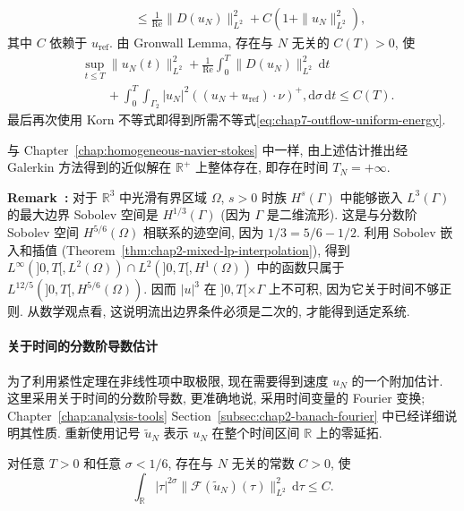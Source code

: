 \begin{sloppypar}
\begin{Proof}
\[\begin{aligned}
 &\qquad\leq\frac1{\operatorname{Re}}\|D(u_N)\|_{L^2}^2
 +C(1+\|u_N\|_{L^2}^2),
\end{aligned}
\]
其中 $C$ 依赖于 $u_{\mathrm{ref}}$. 由 Gronwall Lemma, 存在与 $N$ 无关的 $C(T)>0$, 使
\[
\begin{aligned}
 &\sup_{t\leq T}\|u_N(t)\|_{L^2}^2
 +\frac1{\operatorname{Re}}\int_0^T\|D(u_N)\|_{L^2}^2\,\mathrm dt\\
 &\qquad+\int_0^T\int_{\Gamma_2}|u_N|^2
 ((u_N+u_{\mathrm{ref}})\cdot\nu)^+,\mathrm d\sigma\,\mathrm dt
 \leq C(T).
\end{aligned}
\]
最后再次使用 Korn 不等式即得到所需不等式\eqref{eq:chap7-outflow-uniform-energy}.
\end{Proof}

与 Chapter~\ref{chap:homogeneous-navier-stokes} 中一样, 由上述估计推出经 Galerkin 方法得到的近似解在 $\mathbb R^+$ 上整体存在, 即存在时间 $T_N=+\infty$.

\par\noindent{}\textbf{Remark~\thechaptersevensectiononeremark:}\label{rem:chap7-quadratic-boundary-optimality}
对于 $\mathbb R^3$ 中光滑有界区域 $\Omega$, $s>0$ 时族 $H^s(\Gamma)$ 中能够嵌入 $L^3(\Gamma)$ 的最大边界 Sobolev 空间是 $H^{1/3}(\Gamma)$ (因为 $\Gamma$ 是二维流形). 这是与分数阶 Sobolev 空间 $H^{5/6}(\Omega)$ 相联系的迹空间, 因为 $1/3=5/6-1/2$. 利用 Sobolev 嵌入和插值 (Theorem~\ref{thm:chap2-mixed-lp-interpolation}), 得到 $L^\infty(]0,T[,L^2(\Omega))\cap L^2(]0,T[,H^1(\Omega))$ 中的函数只属于 $L^{12/5}(]0,T[,H^{5/6}(\Omega))$. 因而 $|u|^3$ 在 $]0,T[\times\Gamma$ 上不可积, 因为它关于时间不够正则. 从数学观点看, 这说明流出边界条件必须是二次的, 才能得到适定系统.

\paragraph{关于时间的分数阶导数估计}
\label{subsec:chap7-outflow-fractional-time-estimate}

为了利用紧性定理在非线性项中取极限, 现在需要得到速度 $u_N$ 的一个附加估计. 这里采用关于时间的分数阶导数, 更准确地说, 采用时间变量的 Fourier 变换; Chapter~\ref{chap:analysis-tools} Section~\ref{subsec:chap2-banach-fourier} 中已经详细说明其性质. 重新使用记号 $\widetilde u_N$ 表示 $u_N$ 在整个时间区间 $\mathbb R$ 上的零延拓.

\begin{Proposition}
\label{prop:chap7-outflow-fourier-estimate}
对任意 $T>0$ 和任意 $\sigma<1/6$, 存在与 $N$ 无关的常数 $C>0$, 使
\[
 \int_{\mathbb R}|\tau|^{2\sigma}
 \|\mathcal F(\widetilde u_N)(\tau)\|_{L^2}^2\,\mathrm d\tau
 \leq C.
\]
\end{Proposition}


\end{sloppypar}

